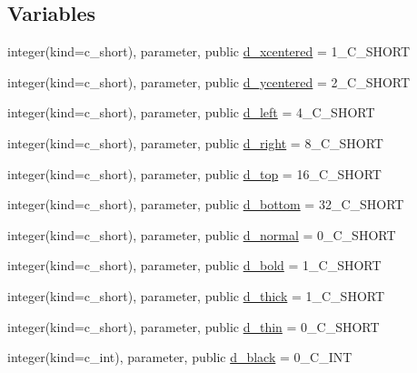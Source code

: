 \subsection*{Variables}
\begin{DoxyCompactItemize}
\item 
integer(kind=c\+\_\+short), parameter, public \mbox{\hyperlink{namespacem__pixel_a17836179f5929a8ec95a2a08da282895}{d\+\_\+xcentered}} = 1\+\_\+\+C\+\_\+\+S\+H\+O\+RT
\item 
integer(kind=c\+\_\+short), parameter, public \mbox{\hyperlink{namespacem__pixel_ad6fa62e363bd143fa3e276622d899cf2}{d\+\_\+ycentered}} = 2\+\_\+\+C\+\_\+\+S\+H\+O\+RT
\item 
integer(kind=c\+\_\+short), parameter, public \mbox{\hyperlink{namespacem__pixel_a5d72b48383d8405bcc75147cf6a8999c}{d\+\_\+left}} = 4\+\_\+\+C\+\_\+\+S\+H\+O\+RT
\item 
integer(kind=c\+\_\+short), parameter, public \mbox{\hyperlink{namespacem__pixel_abdd69f206e03c992f74bc38fdbdc5341}{d\+\_\+right}} = 8\+\_\+\+C\+\_\+\+S\+H\+O\+RT
\item 
integer(kind=c\+\_\+short), parameter, public \mbox{\hyperlink{namespacem__pixel_adddde832c6f969c69644b065fd80b9c5}{d\+\_\+top}} = 16\+\_\+\+C\+\_\+\+S\+H\+O\+RT
\item 
integer(kind=c\+\_\+short), parameter, public \mbox{\hyperlink{namespacem__pixel_ae996d01c0e74fed7a7dc923f2fce3f0a}{d\+\_\+bottom}} = 32\+\_\+\+C\+\_\+\+S\+H\+O\+RT
\item 
integer(kind=c\+\_\+short), parameter, public \mbox{\hyperlink{namespacem__pixel_a9a55ef644fd7b8d4c11edddecadd5cd9}{d\+\_\+normal}} = 0\+\_\+\+C\+\_\+\+S\+H\+O\+RT
\item 
integer(kind=c\+\_\+short), parameter, public \mbox{\hyperlink{namespacem__pixel_a19f01bd571c0cf1d8a1cbb3f7d43bfae}{d\+\_\+bold}} = 1\+\_\+\+C\+\_\+\+S\+H\+O\+RT
\item 
integer(kind=c\+\_\+short), parameter, public \mbox{\hyperlink{namespacem__pixel_a095fd528e2868919dfc3711aa1fea54d}{d\+\_\+thick}} = 1\+\_\+\+C\+\_\+\+S\+H\+O\+RT
\item 
integer(kind=c\+\_\+short), parameter, public \mbox{\hyperlink{namespacem__pixel_acc98e97d1c60df778c0d4035653d24c8}{d\+\_\+thin}} = 0\+\_\+\+C\+\_\+\+S\+H\+O\+RT
\item 
integer(kind=c\+\_\+int), parameter, public \mbox{\hyperlink{namespacem__pixel_a6f1238ade91dacb2d8c24ac393f2f8f4}{d\+\_\+black}} = 0\+\_\+\+C\+\_\+\+I\+NT
\item 

\end{DoxyCompactItemize}
